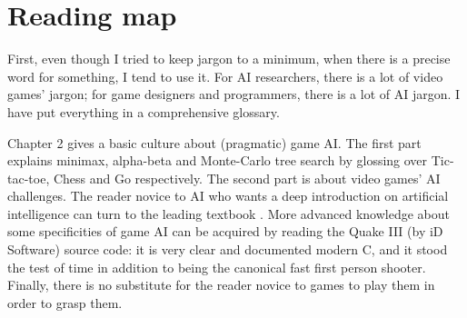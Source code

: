 

\section{Reading map}
First, even though I tried to keep jargon to a minimum, when there is a precise word for something, I tend to use it. For AI researchers, there is a lot of video games' jargon; for game designers and programmers, there is a lot of AI jargon. I have put everything in a comprehensive glossary.

Chapter 2 gives a basic culture about (pragmatic) game AI. The first part explains minimax, alpha-beta and Monte-Carlo tree search by glossing over Tic-tac-toe, Chess and Go respectively. The second part is about video games' AI challenges. The reader novice to AI who wants a deep introduction on artificial intelligence can turn to the leading textbook \citep{AIMA}. More advanced knowledge about some specificities of game AI can be acquired by reading the Quake III (by iD Software) source code: it is very clear and documented modern C, and it stood the test of time in addition to being the canonical fast first person shooter. Finally, there is no substitute for the reader novice to games to play them in order to grasp them.

